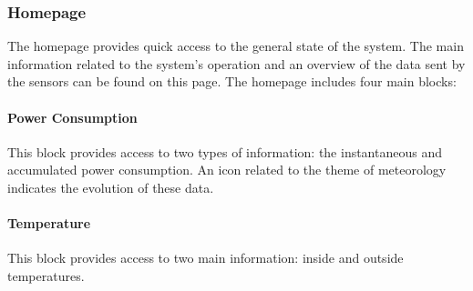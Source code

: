     \begin{figure}[!h] 
        \centering
    \end{figure}

     
\subsubsection{Homepage}

The homepage provides quick access to the general state of the system.
The main information related to the system's operation and an overview of the data sent by the sensors can be found on this page.
The homepage includes four main blocks:%
    \paragraph{Power Consumption} 
    This block provides access to two types of information: the instantaneous and accumulated power consumption. An icon related to the theme of meteorology indicates the evolution of these data. %
    \paragraph{Temperature}
    This block provides access to two main information: inside and outside temperatures.
